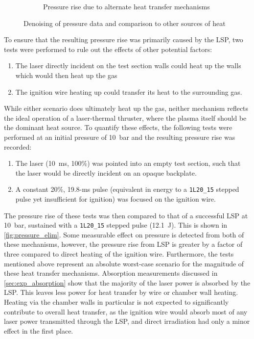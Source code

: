 \begin{figure}[h]
\begin{subfigure}[t]{0.47\textwidth}
                    \caption{Pressure rise due to alternate heat transfer mechanisms}
                    \label{fig:pressure_elim}
                \end{subfigure}
                \caption{Denoising of pressure data and comparison to other sources of heat}
            \end{figure}

            
            To ensure that the resulting pressure rise was primarily caused by the LSP, two tests were performed to rule out the effects of other potential factors:
            \begin{enumerate}
                \item The laser directly incident on the test section walls could heat up the walls which would then heat up the gas
                \item The ignition wire heating up could transfer its heat to the surrounding gas.
            \end{enumerate}
            While either scenario does ultimately heat up the gas, neither mechanism reflects the ideal operation of a laser-thermal thruster, where the plasma itself should be the dominant heat source. To quantify these effects, the following tests were performed at an initial pressure of \qty{10}{bar} and the resulting pressure rise was recorded:
            \begin{enumerate}
                \item The laser (\qty{10}{ms}, 100\%) was pointed into an empty test section, such that the laser would be directly incident on an opaque backplate.
                \item A constant 20\%, \num{19.8}-\unit{ms} pulse (equivalent in energy to a \texttt{1L20\_15} stepped pulse yet insufficient for ignition) was focused on the ignition wire.
            \end{enumerate}
            The pressure rise of these tests was then compared to that of a successful LSP at \qty{10}{bar}, sustained with a \texttt{1L20\_15} stepped pulse (\qty{12.1}{J}). This is shown in \autoref{fig:pressure_elim}. Some measurable effect on pressure is detected from both of these mechanisms, however, the pressure rise from LSP is greater by a factor of three compared to direct heating of the ignition wire. Furthermore, the tests mentioned above represent an absolute worst-case scenario for the magnitude of these heat transfer mechanisms. Absorption measurements discussed in \autoref{sec:exp_absorption} show that the majority of the laser power is absorbed by the LSP. This leaves less power for heat transfer by wire or chamber wall heating. Heating via the chamber walls in particular is not expected to significantly contribute to overall heat transfer, as the ignition wire would absorb most of any laser power transmitted through the LSP, and direct irradiation had only a minor effect in the first place.


